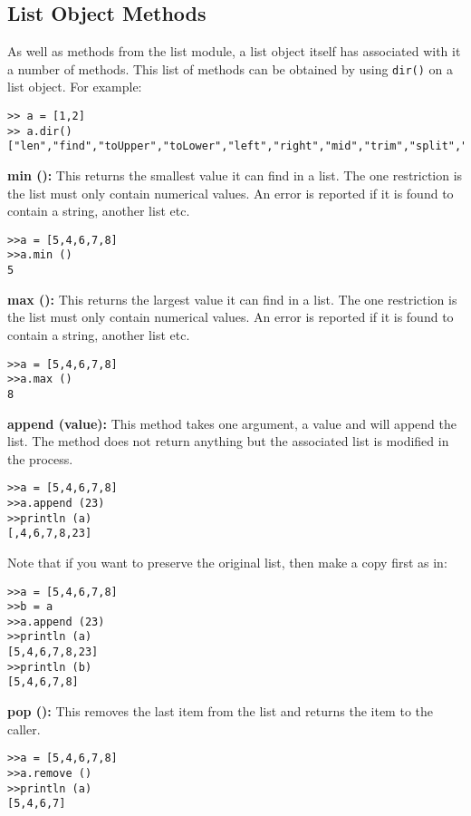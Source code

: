 \subsection*{List Object Methods}

As well as methods from the list module, a list object itself has associated with it a number of methods. This list of methods can be obtained by using {\tt dir()} on a list object. For example:

\begin{lstlisting}
>> a = [1,2]
>> a.dir()
["len","find","toUpper","toLower","left","right","mid","trim","split","dir"]
\end{lstlisting}


\colorbox{blue!10}{\bf min ():} This returns the smallest value it can find in a list. The one restriction is the list must only contain numerical values. An error is reported if it is found to contain
a string, another list etc.


\begin{lstlisting}
>>a = [5,4,6,7,8]
>>a.min ()
5
\end{lstlisting}


\colorbox{blue!10}{\bf max ():} This returns the largest value it can find in a list. The one restriction is the list must only contain numerical values. An error is reported if it is found to contain
a string, another list etc.

\begin{lstlisting}
>>a = [5,4,6,7,8]
>>a.max ()
8
\end{lstlisting}


\colorbox{blue!10}{\bf append (value):} This method takes one argument, a value and will append the list. The method does not return anything but the associated list is modified in the process.
\begin{lstlisting}
>>a = [5,4,6,7,8]
>>a.append (23)
>>println (a)
[,4,6,7,8,23]
\end{lstlisting}

Note that if you want to preserve the original list, then make a copy first as in:

\begin{lstlisting}
>>a = [5,4,6,7,8]
>>b = a
>>a.append (23)
>>println (a)
[5,4,6,7,8,23]
>>println (b)
[5,4,6,7,8]
\end{lstlisting}


\colorbox{blue!10}{\bf pop ():} This removes the last item from the list and returns the item to the caller.

\begin{lstlisting}
>>a = [5,4,6,7,8]
>>a.remove ()
>>println (a)
[5,4,6,7]
\end{lstlisting}


